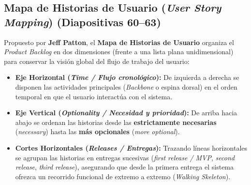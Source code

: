 \subsection{Mapa de Historias de Usuario (\textit{User Story Mapping}) (Diapositivas 60--63)}

Propuesto por \textbf{Jeff Patton}, el \textbf{Mapa de Historias de Usuario} organiza el \textit{Product Backlog} en dos dimensiones (frente a una lista plana unidimensional) para conservar la visión global del flujo de trabajo del usuario:
\begin{itemize}[itemsep=2pt]
    \item \textbf{Eje Horizontal (\textit{Time / Flujo cronológico}):} De izquierda a derecha se disponen las actividades principales (\textit{Backbone} o espina dorsal) en el orden temporal en que el usuario interactúa con el sistema.
    \item \textbf{Eje Vertical (\textit{Optionality / Necesidad y prioridad}):} De arriba hacia abajo se ordenan las historias desde las \textbf{estrictamente necesarias} (\textit{necessary}) hasta las \textbf{más opcionales} (\textit{more optional}).
    \item \textbf{Cortes Horizontales (\textit{Releases / Entregas}):} Trazando líneas horizontales se agrupan las historias en entregas sucesivas (\textit{first release / MVP}, \textit{second release}, \textit{third release}), asegurando que desde la primera entrega el sistema ofrezca un recorrido funcional de extremo a extremo (\textit{Walking Skeleton}).
\end{itemize}

